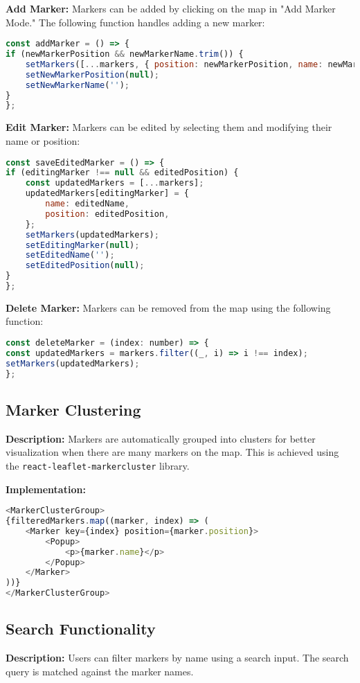 \documentclass[11pt]{article}
\begin{document}
    \textbf{Add Marker:}
    Markers can be added by clicking on the map in "Add Marker Mode." The following function handles adding a new marker:
    \begin{lstlisting}[language=javascript]
const addMarker = () => {
if (newMarkerPosition && newMarkerName.trim()) {
    setMarkers([...markers, { position: newMarkerPosition, name: newMarkerName }]);
    setNewMarkerPosition(null);
    setNewMarkerName('');
}
};
    \end{lstlisting}

    \textbf{Edit Marker:}
    Markers can be edited by selecting them and modifying their name or position:
    \begin{lstlisting}[language=javascript]
const saveEditedMarker = () => {
if (editingMarker !== null && editedPosition) {
    const updatedMarkers = [...markers];
    updatedMarkers[editingMarker] = {
        name: editedName,
        position: editedPosition,
    };
    setMarkers(updatedMarkers);
    setEditingMarker(null);
    setEditedName('');
    setEditedPosition(null);
}
};
    \end{lstlisting}

    \textbf{Delete Marker:}
    Markers can be removed from the map using the following function:
    \begin{lstlisting}[language=javascript]
const deleteMarker = (index: number) => {
const updatedMarkers = markers.filter((_, i) => i !== index);
setMarkers(updatedMarkers);
};
    \end{lstlisting}

    \subsection{Marker Clustering}
    \textbf{Description:} Markers are automatically grouped into clusters for better visualization when there are many markers on the map. This is achieved using the \texttt{react-leaflet-markercluster} library.

    \textbf{Implementation:}
    \begin{lstlisting}[language=javascript]
<MarkerClusterGroup>
{filteredMarkers.map((marker, index) => (
    <Marker key={index} position={marker.position}>
        <Popup>
            <p>{marker.name}</p>
        </Popup>
    </Marker>
))}
</MarkerClusterGroup>
    \end{lstlisting}

    \subsection{Search Functionality}
    \textbf{Description:} Users can filter markers by name using a search input. The search query is matched against the marker names.
\end{document}
